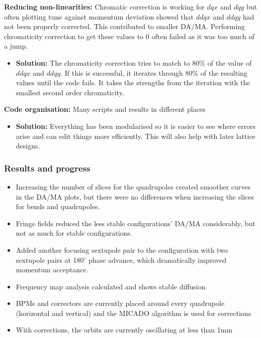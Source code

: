 \documentclass{article}
\begin{document}
\textbf{Reducing non-linearities:} Chromatic correction is working for $dqx$ and $dqy$ but often plotting tune against momentum deviation showed that $ddqx$ and $ddqy$ had not been properly corrected. This contributed to smaller DA/MA. Performing chromaticity correction to get these values to 0 often failed as it was too much of a jump.
\begin{itemize}
    \item \textbf{Solution:} The chromaticity correction tries to match to 80\% of the value of $ddqx$ and $ddqy$. If this is successful, it iterates through 80\% of the resulting values until the code fails. It takes the strengths from the iteration with the smallest second order chromaticity.
\end{itemize}


\textbf{Code organisation:} Many scripts and results in different places
\begin{itemize}
    \item \textbf{Solution:} Everything has been modularised so it is easier to see where errors arise and can edit things more efficiently. This will also help with later lattice designs.
\end{itemize}

\subsubsection{Results and progress}
\begin{itemize}
    \item Increasing the number of slices for the quadrupoles created smoother curves in the DA/MA plots, but there were no differences when increasing the slices for bends and quadrupoles.
    \item Fringe fields reduced the less stable configurations' DA/MA considerably, but not as much for stable configurations.
    \item Added another focusing sextupole pair to the configuration with two sextupole pairs at 180$^\circ$ phase advance, which dramatically improved momentum acceptance.
    \item Frequency map analysis calculated and shows stable diffusion
    \item BPMs and correctors are currently placed around every quadrupole (horizontal and vertical) and the MICADO algorithm is used for corrections
    \item With corrections, the orbits are currently oscillating at less than 1mm
\end{itemize}
\end{document}
